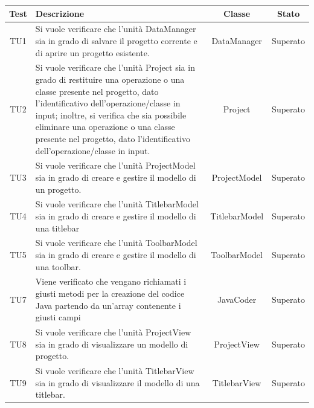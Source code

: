 \documentclass[../PianoDiQualifica.tex]{subfiles}
\begin{document}
		\begin{longtable}{|c|>{\centering}p{8cm}|c|c|}
		\hline
		\textbf{Test} & \textbf{Descrizione} & \textbf{Classe} & \textbf{Stato}\\
		\hline
		 \hypertarget{TU1}{TU1} &Si vuole verificare che l'unità DataManager sia in grado di salvare il progetto corrente e di aprire un progetto esistente. & DataManager & Superato\\
		\hline
		\hypertarget{TU2}{TU2}&  Si vuole verificare che l'unità Project sia in grado di restituire una operazione o una classe presente nel progetto, dato l'identificativo dell'operazione/classe in input; inoltre, si verifica che sia possibile eliminare una operazione o una classe presente nel progetto, dato l'identificativo dell'operazione/classe in input. & Project  & Superato\\
		\hline
		\hypertarget{TU3}{TU3} & Si vuole verificare che l'unità ProjectModel sia in grado di creare e gestire il modello di un progetto. & ProjectModel &Superato\\
		\hline
		\hypertarget{TU4}{TU4}& Si vuole verificare che l'unità TitlebarModel sia in grado di creare e gestire il modello di una titlebar & TitlebarModel  &Superato\\
		\hline
		\hypertarget{TU5}{TU5} &Si vuole verificare che l'unità ToolbarModel sia in grado di creare e gestire il modello di una toolbar. &ToolbarModel &Superato\\
		\hline
		\hypertarget{TU7}{TU7}&Viene verificato che vengano richiamati i giusti metodi per la creazione del codice Java partendo da un'array contenente i giusti campi &JavaCoder &Superato\\
		\hline
		\hypertarget{TU8}{TU8} &Si vuole verificare che l'unità ProjectView sia in grado di visualizzare un modello di progetto.& ProjectView &Superato\\
		\hline
		\hypertarget{TU9}{TU9} &Si vuole verificare che l'unità TitlebarView sia in grado di visualizzare il modello di una titlebar.& TitlebarView &Superato\\
		\hline
		

\end{longtable}
\end{document}

